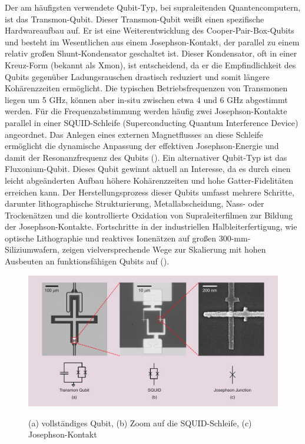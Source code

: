 Der am häufigsten verwendete Qubit-Typ, bei supraleitenden Quantencomputern, ist das Transmon-Qubit. Dieser Transmon-Qubit weißt einen spezifische Hardwareaufbau auf. Er ist eine Weiterentwicklung des Cooper-Pair-Box-Qubits und besteht im Wesentlichen aus einem Josephson-Kontakt, der parallel zu einem relativ großen Shunt-Kondensator geschaltet ist. Dieser Kondensator, oft in einer \glqq Kreuz\grqq{}-Form (bekannt als Xmon), ist entscheidend, da er die Empfindlichkeit des Qubits gegenüber Ladungsrauschen drastisch reduziert und somit längere Kohärenzzeiten ermöglicht. Die typischen Betriebsfrequenzen von Transmonen liegen um 5 GHz, können aber in-situ zwischen etwa 4 und 6 GHz abgestimmt werden. Für die Frequenzabstimmung werden häufig zwei Josephson-Kontakte parallel in einer SQUID-Schleife (Superconducting Quantum Interference Device) angeordnet. Das Anlegen eines externen Magnetflusses an diese Schleife ermöglicht die dynamische Anpassung der effektiven Josephson-Energie und damit der Resonanzfrequenz des Qubits (\cite{roth_transmon_2023}). Ein alternativer Qubit-Typ ist das Fluxonium-Qubit. Dieses Qubit gewinnt aktuell an Interesse, da es durch einen leicht abgeänderten Aufbau höhere Kohärenzzeiten und hohe Gatter-Fidelitäten erreichen kann. Der Herstellungsprozess dieser Qubits umfasst mehrere Schritte, darunter lithographische Strukturierung, Metallabscheidung, Nass- oder Trockenätzen und die kontrollierte Oxidation von Supraleiterfilmen zur Bildung der Josephson-Kontakte. Fortschritte in der industriellen Halbleiterfertigung, wie optische Lithographie und reaktives Ionenätzen auf großen 300-mm-Siliziumwafern, zeigen vielversprechende Wege zur Skalierung mit hohen Ausbeuten an funktionsfähigen Qubits auf (\cite{bentley_quiet_2025}).

\begin{figure}[H]
    \centering
    \includegraphics[width=1\textwidth]{images/quanten-hardware/Transmon Qubit.jpg}
    \caption{(a) vollständiges Qubit, (b) Zoom auf die SQUID-Schleife, (c) Josephson-Kontakt}
    \label{fig:transom_image}
    \cite{roth_transmon_nodate}
    \end{figure}

